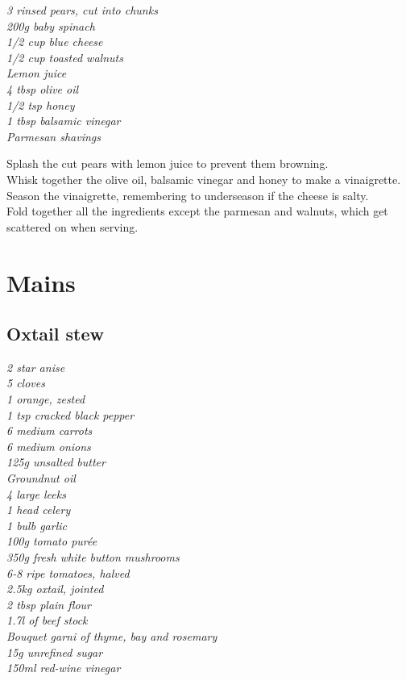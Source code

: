 \documentclass{tufte-book}
\begin{document}
\smallskip
\emph{3 rinsed pears, cut into chunks
\\200g baby spinach
\\1/2 cup blue cheese
\\1/2 cup toasted walnuts
\\Lemon juice
\\4 tbsp olive oil
\\1/2 tsp honey
\\1 tbsp balsamic vinegar
\\Parmesan shavings
}

\smallskip
Splash the cut pears with lemon juice to prevent them browning.
\\Whisk together the olive oil, balsamic vinegar and honey to make a vinaigrette.
\\Season the vinaigrette, remembering to underseason if the cheese is salty.
\\Fold together all the ingredients except the parmesan and walnuts, which get scattered on when serving.

\chapter{Mains}

\section{Oxtail stew}

\smallskip
\emph{2 star anise 
\\5 cloves 
\\1 orange, zested 
\\1 tsp cracked black pepper 
\\6 medium carrots 
\\6 medium onions 
\\125g unsalted butter 
\\Groundnut oil 
\\4 large leeks 
\\1 head celery 
\\1 bulb garlic 
\\100g tomato pur\'ee
\\350g fresh white button mushrooms 
\\6-8 ripe tomatoes, halved  
\\2.5kg oxtail, jointed
\\2 tbsp plain flour 
\\1.7l of beef stock
\\Bouquet garni of thyme, bay and rosemary
\\15g unrefined sugar 
\\150ml red-wine vinegar}
\end{document}
